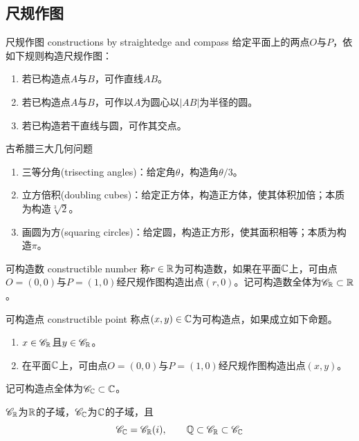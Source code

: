 \subsection{尺规作图}

\begin{definition}{尺规作图 constructions by straightedge and compass}
	给定平面上的两点$O$与$P$，依如下规则构造尺规作图：
	\begin{enumerate}
		\item 若已构造点$A$与$B$，可作直线$AB$。
		\item 若已构造点$A$与$B$，可作以$A$为圆心以$|AB|$为半径的圆。
		\item 若已构造若干直线与圆，可作其交点。
	\end{enumerate}
\end{definition}

\begin{definition}{古希腊三大几何问题}
	\begin{enumerate}
		\item 三等分角(trisecting angles)：给定角$\theta$，构造角$\theta/3$。
		\item 立方倍积(doubling cubes)：给定正方体，构造正方体，使其体积加倍；本质为构造$\sqrt[3]{2}$。
		\item 画圆为方(squaring circles)：给定圆，构造正方形，使其面积相等；本质为构造$\pi$。
	\end{enumerate}
\end{definition}

\begin{definition}{可构造数 constructible number}
	称$r\in\mathbb{R}$为可构造数，如果在平面$\mathbb{C}$上，可由点$O=(0,0)$与$P=(1,0)$经尺规作图构造出点$(r,0)$。记可构造数全体为$\mathscr{C}_{\mathbb{R}}\subset\mathbb{R}$。
\end{definition}

\begin{definition}{可构造点 constructible point}
	称点$(x,y)\in\mathbb{C}$为可构造点，如果成立如下命题。
	\begin{enumerate}
		\item $x\in\mathscr{C}_{\mathbb{R}}$且$y\in\mathscr{C}_{\mathbb{R}}$。
		\item 在平面$\mathbb{C}$上，可由点$O=(0,0)$与$P=(1,0)$经尺规作图构造出点$(x,y)$。
	\end{enumerate}
	记可构造点全体为$\mathscr{C}_{\mathbb{C}}\subset\mathbb{C}$。
\end{definition}

\begin{lemma}
	$\mathscr{C}_{\mathbb{R}}$为$\mathbb{R}$的子域，$\mathscr{C}_{\mathbb{C}}$为$\mathbb{C}$的子域，且%
	$$
	\mathscr{C}_{\mathbb{C}}=\mathscr{C}_{\mathbb{R}}(i),\qquad 
	\mathbb{Q}\subset\mathscr{C}_{\mathbb{R}}\subset \mathscr{C}_{\mathbb{C}}
	$$
\end{lemma}

